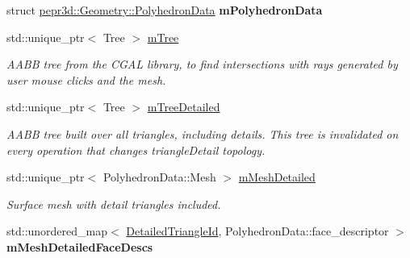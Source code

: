 \begin{DoxyCompactItemize}
\mbox{\label{classpepr3d_1_1_geometry_aa4c82bc662d7178d9a79ae47a513c790}} 
struct \mbox{\hyperlink{structpepr3d_1_1_geometry_1_1_polyhedron_data}{pepr3d\+::\+Geometry\+::\+Polyhedron\+Data}} {\bfseries m\+Polyhedron\+Data}
\item 
\mbox{\label{classpepr3d_1_1_geometry_ab9f70b2e8bbd7a9baa001b981c6215aa}} 
std\+::unique\+\_\+ptr$<$ Tree $>$ \mbox{\hyperlink{classpepr3d_1_1_geometry_ab9f70b2e8bbd7a9baa001b981c6215aa}{m\+Tree}}
\begin{DoxyCompactList}\small\item\em A\+A\+BB tree from the C\+G\+AL library, to find intersections with rays generated by user mouse clicks and the mesh. \end{DoxyCompactList}\item 
\mbox{\label{classpepr3d_1_1_geometry_a1108d0993ef23fb246ae10244a0c2240}} 
std\+::unique\+\_\+ptr$<$ Tree $>$ \mbox{\hyperlink{classpepr3d_1_1_geometry_a1108d0993ef23fb246ae10244a0c2240}{m\+Tree\+Detailed}}
\begin{DoxyCompactList}\small\item\em A\+A\+BB tree built over all triangles, including details. This tree is invalidated on every operation that changes triangle\+Detail topology. \end{DoxyCompactList}\item 
\mbox{\label{classpepr3d_1_1_geometry_a73e2b6c74082b59b5d99d58e018e5bff}} 
std\+::unique\+\_\+ptr$<$ Polyhedron\+Data\+::\+Mesh $>$ \mbox{\hyperlink{classpepr3d_1_1_geometry_a73e2b6c74082b59b5d99d58e018e5bff}{m\+Mesh\+Detailed}}
\begin{DoxyCompactList}\small\item\em Surface mesh with detail triangles included. \end{DoxyCompactList}\item 
\mbox{\label{classpepr3d_1_1_geometry_a111ad109dfecf9e9d3371291d1271ac9}} 
std\+::unordered\+\_\+map$<$ \mbox{\hyperlink{structpepr3d_1_1_detailed_triangle_id}{Detailed\+Triangle\+Id}}, Polyhedron\+Data\+::face\+\_\+descriptor $>$ {\bfseries m\+Mesh\+Detailed\+Face\+Descs}
\item 
\mbox{\label{classpepr3d_1_1_geometry_adf2777044b00de455536e8bc0efc3b07}} 

\end{DoxyCompactItemize}
